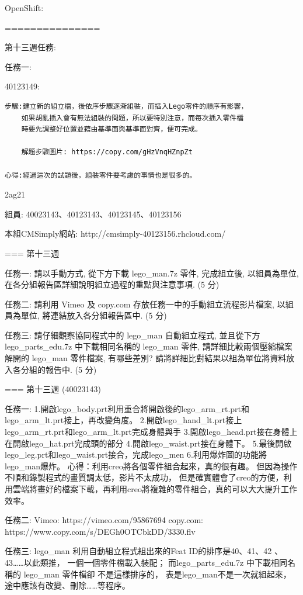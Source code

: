 \documentclass[]{article}
\begin{document}
OpenShift:

===============

第十三週任務:

任務一:

40123149:

\begin{verbatim}
步驟:建立新的組立檔，後依序步驟逐漸組裝，而插入Lego零件的順序有影響，
    如果胡亂插入會有無法組裝的問題，所以要特別注意，而每次插入零件檔
    時要先調整好位置並藉由基準面與基準面對齊，便可完成。

    解題步驟圖片: https://copy.com/gHzVnqHZnpZt
    
心得:經過這次的試題後，組裝零件要考慮的事情也是很多的。
\end{verbatim}

2ag21

組員: 40023143、40123143、40123145、40123156

本組CMSimply網站: http://cmsimply-40123156.rhcloud.com/

=== 第十三週

任務一: 請以手動方式, 從下方下載 lego\_man.7z 零件, 完成組立後,
以組員為單位, 在各分組報告區詳細說明組立過程的重點與注意事項. (5 分)

任務二: 請利用 Vimeo 及 copy.com 存放任務一中的手動組立流程影片檔案,
以組員為單位, 將連結放入各分組報告區中. (5 分)

任務三: 請仔細觀察協同程式中的 lego\_man 自動組立程式, 並且從下方
lego\_parts\_edu.7z 中下載相同名稱的 lego\_man 零件,
請詳細比較兩個壓縮檔案解開的 lego\_man 零件檔案, 有哪些差別?
請將詳細比對結果以組為單位將資料放入各分組的報告中. (5 分)

=== 第十三週 (40023143)

任務一:
1.開啟lego\_body.prt利用重合將開啟後的lego\_arm\_rt.prt和lego\_arm\_lt.prt接上，再改變角度。
2.開啟lego\_hand\_lt.prt接上lego\_arm\_rt.prt和lego\_arm\_lt.prt完成身體與手
3.開啟lego\_head.prt接在身體上在開啟lego\_hat.prt完成頭的部分
4.開啟lego\_waist.prt接在身體下。
5.最後開啟lego\_leg.prt和lego\_waist.prt接合，完成lego\_men
6.利用爆炸圖的功能將lego\_man爆炸。
心得：利用creo將各個零件組合起來，真的很有趣。
但因為操作不順和錄製程式的畫質調太低，影片不太成功，
但是確實體會了creo的方便，利用雲端將畫好的檔案下載，再利用creo將複雜的零件組合，真的可以大大提升工作效率。

任務二: Vimeo: https://vimeo.com/95867694 copy.com:
https://www.copy.com/s/DEGh0OTCbkDD/3330.flv

任務三: lego\_man 利用自動組立程式組出來的Feat ID的排序是40、41、42
、43\ldots{}\ldots{}以此類推， 一個一個零件檔載入裝配；
而lego\_parts\_edu.7z 中下載相同名稱的 lego\_man 零件檔卻
不是這樣排序的，
表是lego\_man不是一次就組起來，途中應該有改變、刪除\ldots{}\ldots{}等程序。
\end{document}
